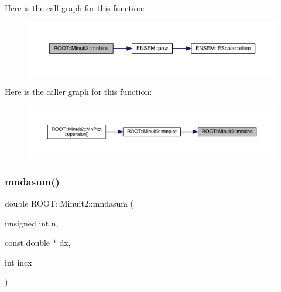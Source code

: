 Here is the call graph for this function\+:\nopagebreak
\begin{figure}[H]
\begin{center}
\leavevmode
\includegraphics[width=350pt]{d6/d3a/namespaceROOT_1_1Minuit2_ac22433ee68c6274fa7028a58763d04bd_cgraph}
\end{center}
\end{figure}
Here is the caller graph for this function\+:\nopagebreak
\begin{figure}[H]
\begin{center}
\leavevmode
\includegraphics[width=350pt]{d6/d3a/namespaceROOT_1_1Minuit2_ac22433ee68c6274fa7028a58763d04bd_icgraph}
\end{center}
\end{figure}
\mbox{\label{namespaceROOT_1_1Minuit2_a6945787dc86a55296d0de1bf1fefc508}} 
\subsubsection{\texorpdfstring{mndasum()}{mndasum()}}
{\footnotesize\ttfamily double R\+O\+O\+T\+::\+Minuit2\+::mndasum (\begin{DoxyParamCaption}\item[{unsigned int}]{n,  }\item[{const double $\ast$}]{dx,  }\item[{int}]{incx }\end{DoxyParamCaption})}

